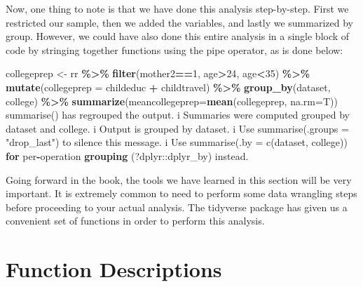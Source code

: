 \documentclass[
]{book}
\newenvironment{Shaded}{\begin{snugshade}}{\end{snugshade}}
\newcommand{\AttributeTok}[1]{\textcolor[rgb]{0.13,0.29,0.53}{#1}}
\newcommand{\ControlFlowTok}[1]{\textcolor[rgb]{0.13,0.29,0.53}{\textbf{#1}}}
\newcommand{\DecValTok}[1]{\textcolor[rgb]{0.00,0.00,0.81}{#1}}
\newcommand{\FunctionTok}[1]{\textcolor[rgb]{0.13,0.29,0.53}{\textbf{#1}}}
\newcommand{\NormalTok}[1]{#1}
\newcommand{\OtherTok}[1]{\textcolor[rgb]{0.56,0.35,0.01}{#1}}
\newcommand{\SpecialCharTok}[1]{\textcolor[rgb]{0.81,0.36,0.00}{\textbf{#1}}}
\newcommand{\StringTok}[1]{\textcolor[rgb]{0.31,0.60,0.02}{#1}}
\begin{document}
Now, one thing to note is that we have done this analysis step-by-step. First we restricted our sample, then we added the variables, and lastly we summarized by group. However, we could have also done this entire analysis in a single block of code by stringing together functions using the pipe operator, as is done below:

\begin{Shaded}
\begin{Highlighting}[]
\NormalTok{collegeprep }\OtherTok{\textless{}{-}}\NormalTok{ rr }\SpecialCharTok{\%\textgreater{}\%}
  \FunctionTok{filter}\NormalTok{(mother2}\SpecialCharTok{==}\DecValTok{1}\NormalTok{, age}\SpecialCharTok{\textgreater{}}\DecValTok{24}\NormalTok{, age}\SpecialCharTok{\textless{}}\DecValTok{35}\NormalTok{) }\SpecialCharTok{\%\textgreater{}\%}
  \FunctionTok{mutate}\NormalTok{(}\AttributeTok{collegeprep =}\NormalTok{ childeduc }\SpecialCharTok{+}\NormalTok{ childtravel) }\SpecialCharTok{\%\textgreater{}\%}
  \FunctionTok{group\_by}\NormalTok{(dataset, college) }\SpecialCharTok{\%\textgreater{}\%}
  \FunctionTok{summarize}\NormalTok{(}\AttributeTok{meancollegeprep=}\FunctionTok{mean}\NormalTok{(collegeprep, }\AttributeTok{na.rm=}\NormalTok{T))}
\StringTok{\textasciigrave{}}\AttributeTok{summarise()}\StringTok{\textasciigrave{}}\NormalTok{ has regrouped the output.}
\NormalTok{i Summaries were computed grouped by dataset and college.}
\NormalTok{i Output is grouped by dataset.}
\NormalTok{i Use }\StringTok{\textasciigrave{}}\AttributeTok{summarise(.groups = "drop\_last")}\StringTok{\textasciigrave{}}\NormalTok{ to silence this}
\NormalTok{  message.}
\NormalTok{i Use }\StringTok{\textasciigrave{}}\AttributeTok{summarise(.by = c(dataset, college))}\StringTok{\textasciigrave{}} \ControlFlowTok{for}
\NormalTok{  per}\SpecialCharTok{{-}}\NormalTok{operation }\FunctionTok{grouping}\NormalTok{ (}\StringTok{\textasciigrave{}}\AttributeTok{?dplyr::dplyr\_by}\StringTok{\textasciigrave{}}\NormalTok{) instead.}
\end{Highlighting}
\end{Shaded}

Going forward in the book, the tools we have learned in this section will be very important. It is extremely common to need to perform some data wrangling steps before proceeding to your actual analysis. The tidyverse package has given us a convenient set of functions in order to perform this analysis.

\section*{Function Descriptions}\label{function-descriptions-1}
\end{document}
